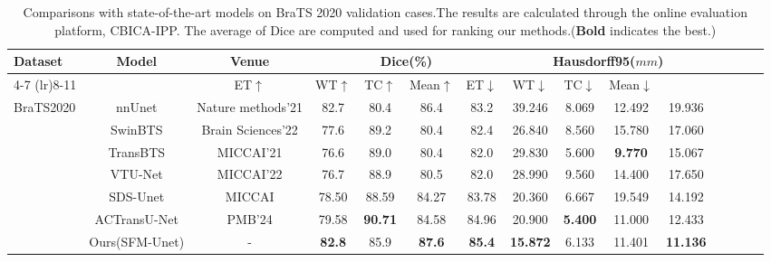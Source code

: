 \documentclass[AMA,Times1COL]{WileyNJDv5} %
\begin{document}
\begin{table}[htbp]
\centering
\scriptsize
\caption{Comparisons with state-of-the-art models on BraTS 2020 validation cases.The results are calculated through the online evaluation platform, CBICA-IPP. The average of Dice are computed and used for ranking our methods.(\textbf{Bold} indicates the best.)}
\begin{tabular}{lcccccccccccccc}
\toprule
\multirow{2}{*}{Dataset} & \multirow{2}{*}{Model}& \multirow{2}{*}{Venue} & \multicolumn{4}{c}{Dice(\%)} & \multicolumn{4}{c}{Hausdorff95($mm$)} \\ 
\cmidrule(lr){4-7} \cmidrule(lr){8-11}
 & & ET$\uparrow$ & WT$\uparrow$ & TC$\uparrow$ & Mean$\uparrow$ & ET$\downarrow$ & WT$\downarrow$ & TC$\downarrow$ & Mean$\downarrow$ \\ 
\midrule
BraTS2020 & nnUnet\cite{isensee2018nnu}&Nature methods'21 & 82.7 & 80.4 & 86.4 & 83.2 & 39.246 & 8.069 & 12.492 & 19.936 \\ 
 & SwinBTS\cite{jiang2022swinbts}&Brain Sciences'22 & 77.6 & 89.2 & 80.4 & 82.4 & 26.840 & 8.560 & 15.780 & 17.060 \\ 
 & TransBTS\cite{wenxuan2021transbts}&MICCAI'21 & 76.6 & 89.0 & 80.4 & 82.0 & 29.830 & 5.600 & \textbf{9.770} & 15.067 \\ 
 & VTU-Net\cite{peiris2022VTU}&MICCAI'22 & 76.7 & 88.9 & 80.5 & 82.0 & 28.990 & 9.560 & 14.400 & 17.650 \\ 
 & SDS-Unet\cite{henry2021brain}&MICCAI &  78.50 & 88.59 & 84.27 & 83.78 & 20.360 & 6.667 & 19.549 & 14.192 \\ 
 & ACTransU-Net\cite{chen2024adaptive}&PMB'24 &  79.58 & \textbf{90.71} &  84.58 &  84.96 & 20.900 & \textbf{5.400} & 11.000 & 12.433 \\ 
 & Ours(SFM-Unet)&- & \textbf{82.8} & 85.9 & \textbf{87.6} & \textbf{85.4} & \textbf{15.872} & 6.133 & 11.401 & \textbf{11.136} \\ 
\bottomrule
\end{tabular}
\label{tab:sota}
\end{table}

\end{document}

